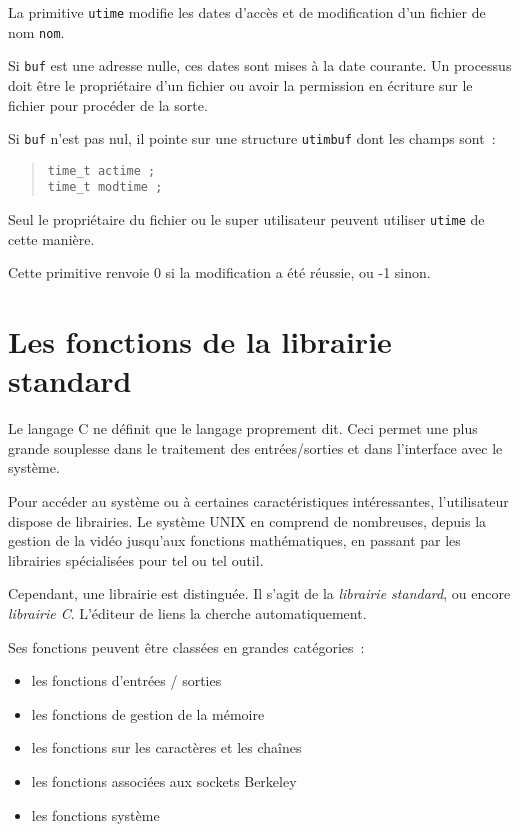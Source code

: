 \documentclass [twoside] {report}
\begin{document}
La primitive {\tt utime} modifie les dates d'accès
et de modification d'un fichier de nom {\tt nom}.

Si {\tt buf} est une adresse nulle, ces dates sont
mises à la date courante. Un processus doit être
le propriétaire d'un fichier ou avoir la
permission en écriture sur le fichier pour
procéder de la sorte.

Si {\tt buf} n'est pas nul, il pointe sur une
structure {\tt utimbuf} dont les champs sont~:

\begin {quote}
\begin {verbatim}
time_t actime ;
time_t modtime ;
\end{verbatim}
\end {quote}

Seul le propriétaire du fichier ou le super
utilisateur peuvent utiliser {\tt utime} de cette
manière.

Cette primitive renvoie 0 si la modification a
été réussie, ou -1 sinon.



\cleardoublepage

\chapter {Les fonctions de la librairie standard}


Le langage C ne définit que le langage proprement dit. Ceci
permet une plus grande souplesse dans le traitement des
entrées/sorties et dans l'interface avec le système.

Pour accéder au système ou à certaines caractéristiques
intéressantes, l'utilisateur dispose de librairies. Le
système UNIX en comprend de nombreuses, depuis la gestion de
la vidéo jusqu'aux fonctions mathématiques, en passant par
les librairies spécialisées pour tel ou tel outil.

Cependant, une librairie est distinguée. Il s'agit de la
{\em librairie standard}, ou encore {\em librairie C}. L'éditeur
de liens la cherche automatiquement.

Ses fonctions peuvent être classées en grandes catégories~:

\begin {itemize}
    \item les fonctions d'entrées / sorties
    \item les fonctions de gestion de la mémoire
    \item les fonctions sur les caractères et les chaînes
    \item les fonctions associées aux sockets Berkeley
    \item les fonctions système
\end {itemize}
\end{document}
